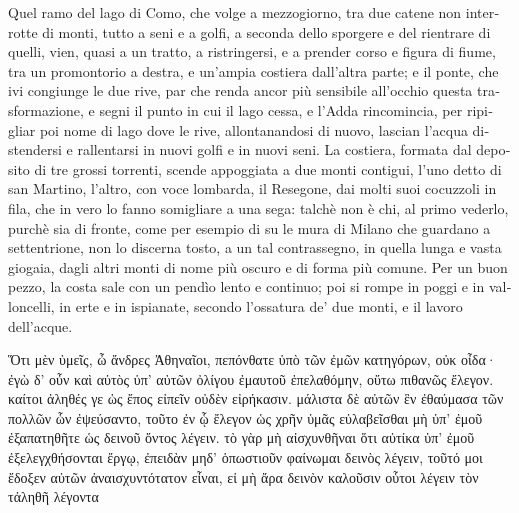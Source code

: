 \documentclass{book}
\begin{document}
\textitalian{Quel ramo del lago di Como, che volge a mezzogiorno, tra due catene non interrotte di monti, tutto a seni e a golfi, a seconda dello sporgere e del rientrare di quelli, vien, quasi a un tratto, a ristringersi, e a prender corso e figura di fiume, tra un promontorio a destra, e un’ampia costiera dall’altra parte; e il ponte, che ivi congiunge le due rive, par che renda ancor più sensibile all’occhio questa trasformazione, e segni il punto in cui il lago cessa, e l’Adda rincomincia, per ripigliar poi nome di lago dove le rive, allontanandosi di nuovo, lascian l’acqua distendersi e rallentarsi in nuovi golfi e in nuovi seni. La costiera, formata dal deposito di tre grossi torrenti, scende appoggiata a due monti contigui, l’uno detto di san Martino, l’altro, con voce lombarda, il Resegone, dai molti suoi cocuzzoli in fila, che in vero lo fanno somigliare a una sega: talchè non è chi, al primo vederlo, purchè sia di fronte, come per esempio di su le mura di Milano che guardano a settentrione, non lo discerna tosto, a un tal contrassegno, in quella lunga e vasta giogaia, dagli altri monti di nome più oscuro e di forma più comune. Per un buon pezzo, la costa sale con un pendìo lento e continuo; poi si rompe in poggi e in valloncelli, in erte e in ispianate, secondo l’ossatura de’ due monti, e il lavoro dell’acque.}

Ὅτι μὲν ὑμεῖς, ὦ ἄνδρες Ἀθηναῖοι, πεπόνθατε ὑπὸ τῶν ἐμῶν κατηγόρων, οὐκ οἶδα· ἐγὼ δ' οὖν καὶ αὐτὸς ὑπ' αὐτῶν ὀλίγου ἐμαυτοῦ ἐπελαθόμην, οὕτω πιθανῶς ἔλεγον. καίτοι ἀληθές γε ὡς ἔπος εἰπεῖν οὐδὲν εἰρήκασιν. μάλιστα δὲ αὐτῶν ἓν ἐθαύμασα τῶν πολλῶν ὧν ἐψεύσαντο, τοῦτο ἐν ᾧ ἔλεγον ὡς χρῆν ὑμᾶς εὐλαβεῖσθαι μὴ ὑπ' ἐμοῦ ἐξαπατηθῆτε ὡς δεινοῦ ὄντος λέγειν. τὸ γὰρ μὴ αἰσχυνθῆναι ὅτι αὐτίκα ὑπ' ἐμοῦ ἐξελεγχθήσονται ἔργῳ, ἐπειδὰν μηδ' ὁπωστιοῦν φαίνωμαι δεινὸς λέγειν, τοῦτό μοι ἔδοξεν αὐτῶν ἀναισχυντότατον εἶναι, εἰ μὴ ἄρα δεινὸν καλοῦσιν οὗτοι λέγειν τὸν τἀληθῆ λέγοντα
\end{document}
